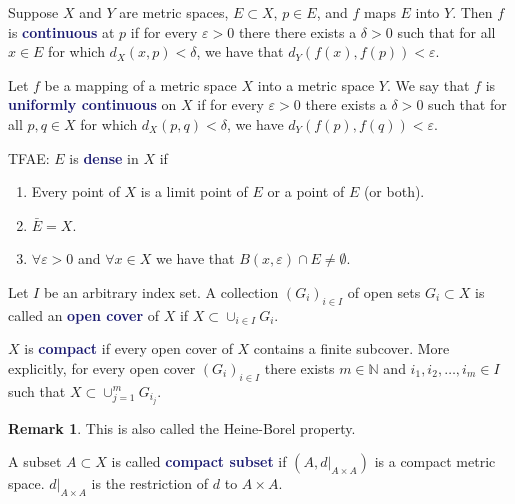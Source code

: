 \documentclass[11pt]{article}
\numberwithin{equation}{section}
\newcommand{\navy}[1]{\textcolor{MidnightBlue}{\bf #1}}
\theoremstyle{definition}
\theoremstyle{definition}
\newtheorem*{remark}{Remark}
\newcommand{\1}{\mathbbm 1}
\def\d{\delta}
\newcommand{\e}{\varepsilon}
\newcommand{\NN}{\mathbb N}
\begin{document}
\begin{definition}[Continuous]
Suppose $X$ and $Y$ are metric spaces, $E \subset X$, $p \in E$, and $f$ maps $E$ into $Y$. Then $f$ is \navy{continuous} at $p$ if for every $\e > 0$ there there exists a $\d > 0$ such that for all $x \in E$ for which $d_X(x,p) < \d$, we have that $d_Y(f(x), f(p)) < \e$.
\end{definition}

\begin{definition}
Let $f$ be a mapping of a metric space $X$ into a metric space $Y$. We say that $f$ is \navy{uniformly continuous} on $X$ if for every $\e > 0$ there exists a $\d > 0$ such that for all $p,q \in X$ for which $d_X(p,q) < \delta$, we have $d_Y(f(p),f(q)) < \e$.
\end{definition}

\begin{definition}[Dense] TFAE: $E$ is \navy{dense} in $X$ if
\begin{enumerate}
\item  Every point of $X$ is a limit point of $E$ or a point of $E$ (or both).
\item $\bar{E} = X$.
\item $\forall \e > 0$ and $\forall x \in X$ we have that $B(x,\e) \cap E \neq \emptyset$.
\end{enumerate}
\end{definition}

\begin{definition}
Let $I$ be an arbitrary index set. A collection $(G_i)_{i \in I}$ of open sets $G_i \subset X$ is called an \navy{open cover} of $X$ if $X \subset \cup_{i \in I} G_{i}$.
\end{definition}

\begin{definition}[Compact]
$X$ is \navy{compact} if every open cover of $X$ contains a finite subcover. More explicitly, for every open cover $(G_i)_{i \in I}$ there exists $m \in \NN$ and $i_1, i_2, \ldots, i_m \in I$ such that $X \subset \cup_{j=1}^m G_{i_j}$.
\begin{remark}
This is also called the Heine-Borel property.
\end{remark}
\end{definition}

\begin{definition}
A subset $A \subset X$ is called \navy{compact subset} if $(A,d\vert_{A\times A})$ is a compact metric space. $d\vert_{A\times A}$ is the restriction of $d$ to $A \times A$.
\end{definition}
\end{document}
